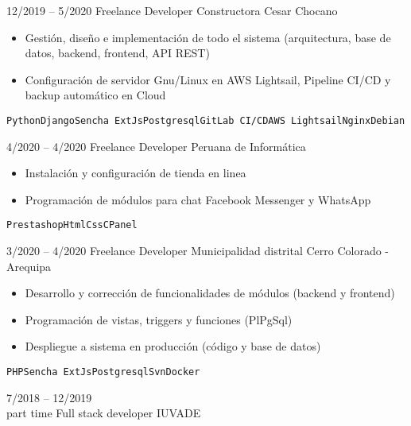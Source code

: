 \begin{entrylist}
{        }
    \entry
		{12/2019 -- 5/2020}
		{Freelance Developer}
		{Constructora Cesar Chocano}
		{
		    \vspace{-5mm}
    	    \begin{itemize}
    	        \setlength\itemsep{0pt}
    	        \item Gestión, diseño e implementación de todo el sistema (arquitectura, base de datos, backend, frontend, API REST)
    	        \item Configuración de servidor Gnu/Linux en AWS Lightsail, Pipeline CI/CD y backup automático en Cloud
    	    \end{itemize}
		    \texttt{Python}\slashsep\texttt{Django}\slashsep\texttt{Sencha ExtJs}\slashsep\texttt{Postgresql}\slashsep\texttt{GitLab CI/CD}\slashsep\texttt{AWS Lightsail}\slashsep\texttt{Nginx}\slashsep\texttt{Debian}
        }
	\entry
		{4/2020 -- 4/2020}
		{Freelance Developer}
		{Peruana de Informática}
		{
		    \vspace{-5mm}
    	    \begin{itemize}
    	        \setlength\itemsep{0pt}
    	        \item Instalación y configuración de tienda en linea
    	        \item Programación de módulos para chat Facebook Messenger y WhatsApp
    	    \end{itemize}
		    \texttt{Prestashop}\slashsep\texttt{Html}\slashsep\texttt{Css}\slashsep\texttt{CPanel}
        }
	\entry
		{3/2020 -- 4/2020}
		{Freelance Developer}
		{Municipalidad distrital Cerro Colorado - Arequipa}
		{
		    \vspace{-5mm}
    	    \begin{itemize}
    	        \setlength\itemsep{0pt}
    	        \item Desarrollo y corrección de funcionalidades de módulos (backend y frontend)
    	        \item Programación de vistas, triggers y funciones (PlPgSql)
    	        \item Despliegue a sistema en producción (código y base de datos)
    	    \end{itemize}
		    \texttt{PHP}\slashsep\texttt{Sencha ExtJs}\slashsep\texttt{Postgresql}\slashsep\texttt{Svn}\slashsep\texttt{Docker}
        }
	\entry
		{7/2018 -- 12/2019\\\footnotesize{part time}}
		{Full stack developer}
		{IUVADE}
		{
		    \vspace{-5mm}
    	    \begin{itemize}

\end{itemize}}
\end{entrylist}
